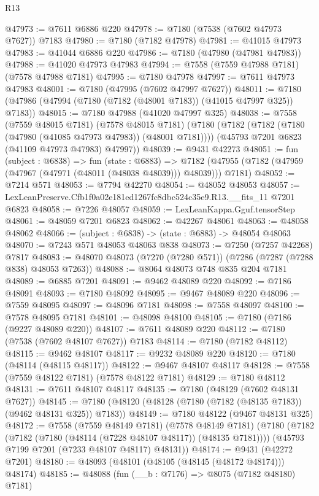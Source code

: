 \begin{lexlean}{R13}
\begin{coremodule}
@47973 := @7611 @6886 @220
@47978 := @7180 (@7538 (@7602 @47973 @7627)) @7183
@47980 := @7180 (@7182 @47978)
@47981 := @41015 @47973
@47983 := @41044 @6886 @220
@47986 := @7180 (@47980 (@47981 @47983))
@47988 := @41020 @47973 @47983
@47994 := @7558 (@7559 @47988 @7181) (@7578 @47988 @7181)
@47995 := @7180 @47978
@47997 := @7611 @47973 @47983
@48001 := @7180 (@47995 (@7602 @47997 @7627))
@48011 := @7180 (@47986 (@47994 (@7180 (@7182 (@48001 @7183)) (@41015 @47997 @325)) @7183))
@48015 := @7180 @47988 (@41020 @47997 @325)
@48038 := @7558
    (@7559 @48015 @7181)
    (@7578 @48015 @7181)
    (@7180
      (@7182 (@7182 (@7180 (@47980 (@41085 @47973 @47983)) (@48001 @7181))))
      (@45793 @7201 @6823 (@41109 @47973 @47983) @47997))
@48039 := @9431 @42273
@48051 := fun (subject : @6838) =>
  fun (state : @6883) =>
  @7182 (@47955 (@7182 (@47959 (@47967 (@47971 (@48011 (@48038 @48039))) @48039))) @7181)
@48052 := @7214 @571
@48053 := @7794 @42270
@48054 := @48052 @48053
@48057 := LexLeanPreserve.Cfb1f0a02e181ed1267fc8dbc524c35e9.R13.__fits_11 @7201 @6823
@48058 := @7226 @48057
@48059 := LexLeanKappa.Gguf.tensorStep
@48061 := @48059 @7201 @6823
@48062 := @42267 @48061
@48063 := @48058 @48062
@48066 := (subject : @6838) -> (state : @6883) -> @48054 @48063
@48070 := @7243 @571 @48053 @48063 @838
@48073 := @7250 (@7257 @42268) @7817
@48083 := @48070 @48073 (@7270 (@7280 @571)) (@7286 (@7287 (@7288 @838) @48053 @7263))
@48088 := @8064 @48073 @748 @835 @204 @7181
@48089 := @6885 @7201
@48091 := @9462 @48089 @220
@48092 := @7186 @48091
@48093 := @7180 @48092
@48095 := @9467 @48089 @220
@48096 := @7559 @48095
@48097 := @48096 @7181
@48098 := @7558 @48097
@48100 := @7578 @48095 @7181
@48101 := @48098 @48100
@48105 := @7180 (@7186 (@9227 @48089 @220))
@48107 := @7611 @48089 @220
@48112 := @7180 (@7538 (@7602 @48107 @7627)) @7183
@48114 := @7180 (@7182 @48112)
@48115 := @9462 @48107
@48117 := @9232 @48089 @220
@48120 := @7180 (@48114 (@48115 @48117))
@48122 := @9467 @48107 @48117
@48128 := @7558 (@7559 @48122 @7181) (@7578 @48122 @7181)
@48129 := @7180 @48112
@48131 := @7611 @48107 @48117
@48135 := @7180 (@48129 (@7602 @48131 @7627))
@48145 := @7180 (@48120 (@48128 (@7180 (@7182 (@48135 @7183)) (@9462 @48131 @325)) @7183))
@48149 := @7180 @48122 (@9467 @48131 @325)
@48172 := @7558
    (@7559 @48149 @7181)
    (@7578 @48149 @7181)
    (@7180
      (@7182 (@7182 (@7180 (@48114 (@7228 @48107 @48117)) (@48135 @7181))))
      (@45793 @7199 @7201 (@7233 @48107 @48117) @48131))
@48174 := @9431 (@42272 @7201)
@48180 := @48093 (@48101 (@48105 (@48145 (@48172 @48174))) @48174)
@48185 := @48088 (fun (__b : @7176) => @8075 (@7182 @48180) @7181)

\end{coremodule}
\end{lexlean}
